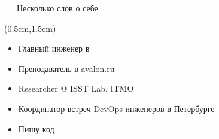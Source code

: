 \documentclass[xetex,18pt,aspectratio=43]{beamer}
\begin{document}
\begin{Large}
\begin{frame}{\ \ \ Несколько слов о себе}
\begin{textblock*}{\framewidth-0.8cm}(0.5cm,1.5cm) %
\begin{itemize}
  \item Главный инженер в \href{https://gitinsky.com}{\color{blue}{Git in Sky}}
  \item Преподаватель в avalon.ru
  \item Researcher @ ISST Lab, ITMO
  \item Координатор встреч DevOps-инженеров в Петербурге
  \item Пишу код
\end{itemize}
\end{textblock*}
\end{frame}






\end{Large}
\end{document}
